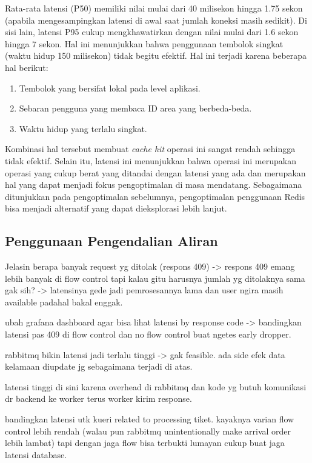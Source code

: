 Rata-rata latensi (P50) memiliki nilai mulai dari 40 milisekon hingga 1.75 sekon (apabila mengesampingkan latensi di awal saat jumlah koneksi masih sedikit). Di sisi lain, latensi P95 cukup mengkhawatirkan dengan nilai mulai dari 1.6 sekon hingga 7 sekon. Hal ini menunjukkan bahwa penggunaan tembolok singkat (waktu hidup 150 milisekon) tidak begitu efektif. Hal ini terjadi karena beberapa hal berikut:

\begin{enumerate}
    \item Tembolok yang bersifat lokal pada level aplikasi.
    \item Sebaran pengguna yang membaca ID area yang berbeda-beda.
    \item Waktu hidup yang terlalu singkat.
\end{enumerate}

Kombinasi hal tersebut membuat \textit{cache hit} operasi ini sangat rendah sehingga tidak efektif. Selain itu, latensi ini menunjukkan bahwa operasi ini merupakan operasi yang cukup berat yang ditandai dengan latensi yang ada dan merupakan hal yang dapat menjadi fokus pengoptimalan di masa mendatang. Sebagaimana ditunjukkan pada pengoptimalan sebelumnya, pengoptimalan penggunaan Redis bisa menjadi alternatif yang dapat dieksplorasi lebih lanjut.

\subsection{Penggunaan Pengendalian Aliran}

Jelasin berapa banyak request yg ditolak (respons 409) -> respons 409 emang lebih banyak di flow control tapi kalau gitu harusnya jumlah yg ditolaknya sama gak sih? -> latensinya gede jadi pemrosesannya lama dan user ngira masih available padahal bakal enggak.

ubah grafana dashboard agar bisa lihat latensi by response code -> bandingkan latensi pas 409 di flow control dan no flow control buat ngetes early dropper.

rabbitmq bikin latensi jadi terlalu tinggi -> gak feasible. ada side efek data kelamaan diupdate jg sebagaimana terjadi di atas.

latensi tinggi di sini karena overhead di rabbitmq dan kode yg butuh komunikasi dr backend ke worker terus worker kirim response.

bandingkan latensi utk kueri related to processing tiket. kayaknya varian flow control lebih rendah (walau pun rabbitmq unintentionally make arrival order lebih lambat) tapi dengan jaga flow bisa terbukti lumayan cukup buat jaga latensi database.

